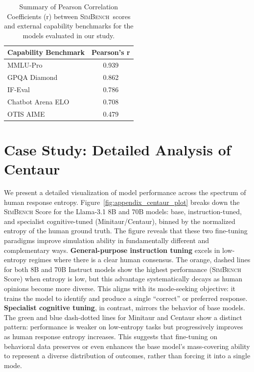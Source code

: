 \documentclass{article} %
\begin{document}
\begin{table}[h!]
\centering
\caption{Summary of Pearson Correlation Coefficients (r) between \textsc{SimBench}\ scores and external capability benchmarks for the models evaluated in our study.}
\label{tab:correlation_summary}
\begin{tabular}{lc}
\toprule
\textbf{Capability Benchmark} & \textbf{Pearson's r} \\
\midrule
MMLU-Pro & 0.939 \\
GPQA Diamond & 0.862 \\
IF-Eval & 0.786 \\
Chatbot Arena ELO & 0.708 \\
OTIS AIME & 0.479 \\
\bottomrule
\end{tabular}
\end{table}







\section{Case Study: Detailed Analysis of Centaur}
\label{app:finetuning_analysis}



We present a detailed visualization of model performance across the spectrum of human response entropy. Figure~\ref{fig:appendix_centaur_plot} breaks down the \textsc{SimBench} Score for the Llama-3.1 8B and 70B models: base, instruction-tuned, and specialist cognitive-tuned (Minitaur/Centaur), binned by the normalized entropy of the human ground truth.
The figure reveals that these two fine-tuning paradigms improve simulation ability in fundamentally different and complementary ways. 
\textbf{General-purpose instruction tuning} excels in low-entropy regimes where there is a clear human consensus. The orange, dashed lines for both 8B and 70B Instruct models show the highest performance (\textsc{SimBench} Score) when entropy is low, but this advantage systematically decays as human opinions become more diverse. This aligns with its mode-seeking objective: it trains the model to identify and produce a single ``correct'' or preferred response.
\textbf{Specialist cognitive tuning}, in contrast, mirrors the behavior of base models. The green and blue dash-dotted lines for Minitaur and Centaur show a distinct pattern: performance is weaker on low-entropy tasks but progressively improves as human response entropy increases. This suggests that fine-tuning on behavioral data preserves or even enhances the base model's mass-covering ability to represent a diverse distribution of outcomes, rather than forcing it into a single mode.
\end{document}
